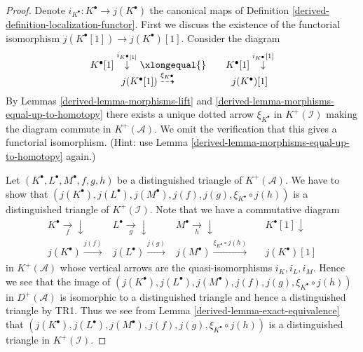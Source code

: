 \begin{proof}

Denote $i_{K^\bullet} : K^\bullet \to j(K^\bullet)$ the
canonical maps of Definition \ref{derived-definition-localization-functor}.
First we discuss the existence of the functorial isomorphism
$j(K^\bullet[1]) \to j(K^\bullet)[1]$.
Consider the diagram
$$
\begin{array}{ccc}K^\bullet[1] \overset{i_{K^\bullet[1]}}{\downarrow}\xlongequal{} &  & K^\bullet[1] \overset{i_{K^\bullet}[1]}{\downarrow} \\ j(K^\bullet[1]) \overset{\xi_{K^\bullet}}{\dashrightarrow} &  & j(K^\bullet)[1]\end{array}
$$
By Lemmas \ref{derived-lemma-morphisms-lift}
and \ref{derived-lemma-morphisms-equal-up-to-homotopy}
there exists a unique dotted arrow $\xi_{K^\bullet}$ in $K^{+}(\mathcal{I})$
making the diagram commute in $K^{+}(\mathcal{A})$.
We omit the verification that this gives a functorial isomorphism.
(Hint: use Lemma \ref{derived-lemma-morphisms-equal-up-to-homotopy} again.)

\medskip\noindent
Let $(K^\bullet, L^\bullet, M^\bullet, f, g, h)$
be a distinguished triangle of $K^{+}(\mathcal{A})$.
We have to show that
$(j(K^\bullet), j(L^\bullet), j(M^\bullet), j(f), j(g),
\xi_{K^\bullet} \circ j(h))$ is
a distinguished triangle of $K^{+}(\mathcal{I})$.
Note that we have a commutative diagram
$$
\begin{array}{ccccc}K^\bullet \underset{f}{\longrightarrow}\downarrow & L^\bullet \underset{g}{\longrightarrow}\downarrow & M^\bullet \underset{h}{\longrightarrow}\downarrow &  & K^\bullet[1] \downarrow \\ j(K^\bullet) \overset{j(f)}{\longrightarrow} & j(L^\bullet) \overset{j(g)}{\longrightarrow} & j(M^\bullet) \overset{\xi_{K^\bullet} \circ j(h)}{\longrightarrow} &  & j(K^\bullet)[1]\end{array}
$$
in $K^{+}(\mathcal{A})$ whose vertical arrows are the quasi-isomorphisms
$i_K, i_L, i_M$. Hence we see that the image of
$(j(K^\bullet), j(L^\bullet), j(M^\bullet), j(f), j(g),
\xi_{K^\bullet} \circ j(h))$
in $D^{+}(\mathcal{A})$ is isomorphic to a distinguished triangle
and hence a distinguished triangle by TR1. Thus we see from
Lemma \ref{derived-lemma-exact-equivalence}
that $(j(K^\bullet), j(L^\bullet), j(M^\bullet), j(f), j(g),
\xi_{K^\bullet} \circ j(h))$ is a distinguished triangle in
$K^{+}(\mathcal{I})$.
\end{proof}

